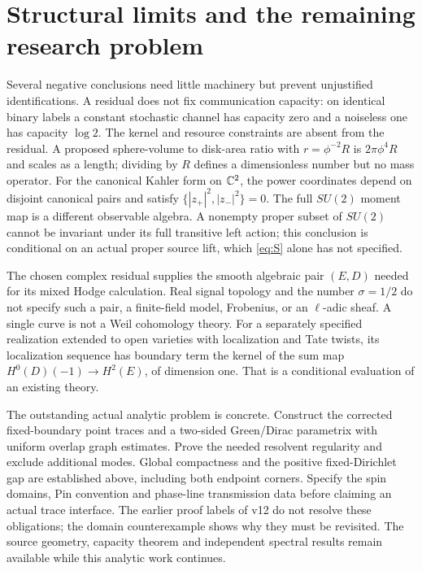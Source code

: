\documentclass[11pt]{article}
\theoremstyle{readable}
\theoremstyle{remark}\newtheorem{remark}[theorem]{Remark}
\begin{document}
\section{Structural limits and the remaining research problem}\label{sec:limits}
Several negative conclusions need little machinery but prevent unjustified
identifications. A residual does not fix communication capacity: on identical
binary labels a constant stochastic channel has capacity zero and a noiseless
one has capacity $\log2$. The kernel and resource constraints are absent from
the residual. A proposed sphere-volume to disk-area ratio with
$r=\phi^{-2}R$ is $2\pi\phi^4R$ and scales as a length; dividing by $R$
defines a dimensionless number but no mass operator.
For the canonical Kahler form on $\mathbb C^2$, the power coordinates depend on
disjoint canonical pairs and satisfy $\{|z_+|^2,|z_-|^2\}=0$.
The full $SU(2)$ moment map is a different observable algebra.
A nonempty proper subset of $SU(2)$ cannot be invariant under its full
transitive left action; this conclusion is conditional on an actual proper
source lift, which \eqref{eq:S} alone has not specified.

The chosen complex residual supplies the smooth algebraic pair $(E,D)$
needed for its mixed Hodge calculation. Real signal topology and the number
$\sigma=1/2$ do not specify such a pair, a finite-field model, Frobenius,
or an $\ell$-adic sheaf. A single curve is not a Weil cohomology theory.
For a separately specified realization extended to open varieties with
localization and Tate twists, its localization sequence has boundary term
the kernel of the sum map $H^0(D)(-1)\to H^2(E)$, of dimension one.
That is a conditional evaluation of an existing theory.

The outstanding actual analytic problem is concrete. Construct the corrected
fixed-boundary point traces and a two-sided Green/Dirac parametrix with
uniform overlap graph estimates. Prove the needed resolvent regularity and
exclude additional modes. Global compactness and the positive fixed-Dirichlet
gap are established above, including both endpoint corners. Specify the spin domains,
Pin convention and phase-line transmission data before claiming an actual
trace interface. The earlier proof labels of v12 do not resolve these
obligations; the domain counterexample shows why they must be revisited.
The source geometry, capacity theorem and independent spectral results remain
available while this analytic work continues.

\appendix
\end{document}
